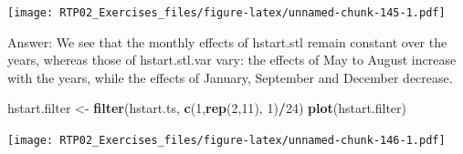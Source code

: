 \documentclass[
]{article}
\newenvironment{Shaded}{\begin{snugshade}}{\end{snugshade}}
\newcommand{\DataTypeTok}[1]{\textcolor[rgb]{0.13,0.29,0.53}{#1}}
\newcommand{\DecValTok}[1]{\textcolor[rgb]{0.00,0.00,0.81}{#1}}
\newcommand{\FloatTok}[1]{\textcolor[rgb]{0.00,0.00,0.81}{#1}}
\newcommand{\KeywordTok}[1]{\textcolor[rgb]{0.13,0.29,0.53}{\textbf{#1}}}
\newcommand{\NormalTok}[1]{#1}
\newcommand{\OperatorTok}[1]{\textcolor[rgb]{0.81,0.36,0.00}{\textbf{#1}}}
\newcommand{\StringTok}[1]{\textcolor[rgb]{0.31,0.60,0.02}{#1}}
\begin{document}
\begin{Shaded}
\end{Shaded}

\texttt{[image: RTP02\_Exercises\_files/figure-latex/unnamed-chunk-145-1.pdf]}

Answer: We see that the monthly effects of hstart.stl remain constant
over the years, whereas those of hstart.stl.var vary: the effects of May
to August increase with the years, while the effects of January,
September and December decrease.

\begin{Shaded}
\begin{Highlighting}[]
\NormalTok{hstart.filter <-}\StringTok{ }\KeywordTok{filter}\NormalTok{(hstart.ts, }\KeywordTok{c}\NormalTok{(}\DecValTok{1}\NormalTok{,}\KeywordTok{rep}\NormalTok{(}\DecValTok{2}\NormalTok{,}\DecValTok{11}\NormalTok{), }\DecValTok{1}\NormalTok{)}\OperatorTok{/}\DecValTok{24}\NormalTok{)}
\KeywordTok{plot}\NormalTok{(hstart.filter)}
\end{Highlighting}
\end{Shaded}

\texttt{[image: RTP02\_Exercises\_files/figure-latex/unnamed-chunk-146-1.pdf]}
\end{document}
